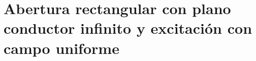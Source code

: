 \newlength{\longitudNtheta}
\newlength{\longitudNphi}
\newlength{\longitudLtheta}
\newlength{\longitudLphi}
\newlength{\longitudEtheta}
\newlength{\longitudEphi}
\newlength{\longitudEthetanor}
\newlength{\longitudEphinor}

\section{Abertura rectangular con plano conductor infinito y excitación con campo uniforme}
\label{sec_apendice_b_abert_rect_inf_uni}

